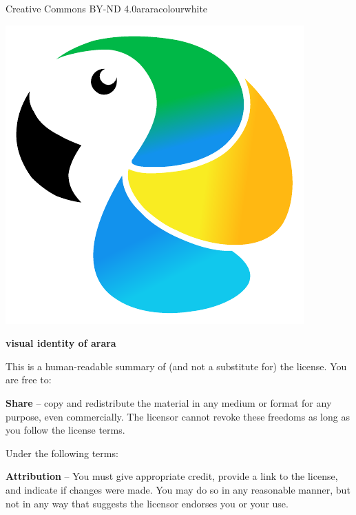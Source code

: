 \documentclass[a4paper,twoside,12pt]{memoir}
\begin{document}
\begin{messagebox}{Creative Commons BY-ND 4.0}{araracolour}{\icinfo}{white}
\begin{minipage}{0.09\textwidth}
\includegraphics[scale=.15]{../logos/bird.pdf}
\end{minipage}%
\begin{minipage}{0.8\textwidth}
\Large{}\selectfont\bfseries\color{araracolour} visual identity of arara
\end{minipage}

\vspace{1em}

This is a human-readable summary of (and not a substitute for) the license. You are free to:

\vspace{1em}

\textbf{Share} -- copy and redistribute the material in any medium or format for any purpose, even commercially. The licensor cannot revoke these freedoms as long as you follow the license terms.

\vspace{1em}

Under the following terms:

\vspace{1em}

\textbf{Attribution} -- You must give appropriate credit, provide a link to the license, and indicate if changes were made. You may do so in any reasonable manner, but not in any way that suggests the licensor endorses you or your use.


\end{messagebox}
\end{document}
